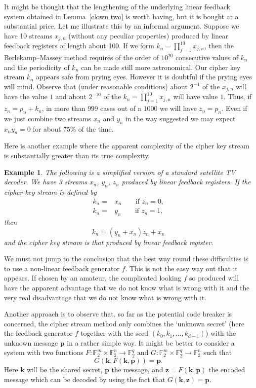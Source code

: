 \documentclass[12pt,a4paper]{article}
\theoremstyle{plain}
\newtheorem{example}[theorem]{Example}
\theoremstyle{definition}
\begin{document}
It might be thought that the lengthening
of the underlying linear feedback system
obtained in Lemma~\ref{clown two} is worth
having, but it is bought at a substantial
price. Let me illustrate this by an informal
argument. Suppose we have 10
streams  $x_{j,n}$ (without any peculiar
properties) produced by
linear feedback registers of length about
100. If we form
$k_{n}=\prod_{j=1}^{10}x_{j,n}$, then
the Berlekamp--Massey method requires
of the order of $10^{20}$ consecutive
values of $k_{n}$ and the periodicity
of $k_{n}$ can be made still more
astronomical. Our cipher key stream
$k_{n}$ appears safe from prying eyes.
However it is doubtful if the prying
eyes will mind. Observe that (under reasonable
conditions) about $2^{-1}$ of the $x_{j,n}$
will have the value $1$ and about
$2^{-10}$ of the $k_{n}=\prod_{j=1}^{10}x_{j,n}$
will have value $1$. Thus, if
$z_{n}=p_{n}+k_{n}$, in more than
$999$ cases out of a $1000$ we will have
$z_{n}=p_{n}$. Even if we just combine
two streams $x_{n}$ and $y_{n}$ in the
way suggested we may expect $x_{n}y_{n}=0$
for about 75\% of the time.


Here is another example where the apparent
complexity of the cipher key stream
is substantially greater than its true
complexity.
\begin{example} The following is a simplified
version of a standard satellite TV decoder.
We have 3 streams  $x_{n}$, $y_{n}$, $z_{n}$
produced by linear feedback registers.
If the cipher key stream is defined by
\begin{align*}
k_{n}=&x_{n}\qquad\text{if $z_{n}=0$},\\
k_{n}=&y_{n}\qquad\text{if $z_{n}=1$},
\end{align*}
then
\[k_{n}=(y_{n}+x_{n})z_{n}+x_{n}\]
and the cipher key stream is that produced
by linear feedback register.
\end{example}

We must not jump to the conclusion 
that the best way round
these difficulties is to use a non-linear
feedback generator $f$. This is not the
easy way out that it appears. If chosen
by an amateur, the  complicated looking
$f$ so produced will have the apparent
advantage that we do not know what is
wrong with it and the very real disadvantage
that we do not know what is
wrong with it.



Another approach is to observe that,
so far as the potential code breaker is
concerned, the
cipher stream method only combines the
`unknown secret' (here the feedback generator
$f$ together with the seed $(k_{0},k_{1},\dots,k_{d-1})$)
with the unknown message ${\mathbf p}$ in a rather
simple way. It might be better to consider a system
with two functions
$F:{\mathbb F}_{2}^{m}\times{\mathbb F}_{2}^{n}
\rightarrow{\mathbb F}_{2}^{q}$ and
$G:{\mathbb F}_{2}^{m}\times{\mathbb F}_{2}^{q}
\rightarrow{\mathbb F}_{2}^{n}$
such that
\[G({\mathbf k},F({\mathbf k},{\mathbf p}))={\mathbf p}.\]
Here ${\mathbf k}$ will be
the shared secret, ${\mathbf p}$ the message, and
${\mathbf z}=F({\mathbf k},{\mathbf p})$ the
encoded message which can be decoded by
using the fact that $G({\mathbf k},{\mathbf z})
={\mathbf p}$.
\end{document}
